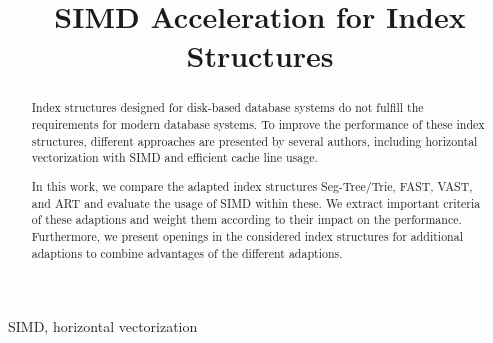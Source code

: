 \documentclass[conference]{IEEEtran}
\begin{document}
\title{SIMD Acceleration for Index Structures\\
}

\author{
}

\maketitle

\begin{abstract}
Index structures designed for disk-based database systems do not fulfill the requirements for modern database systems. To improve the performance of these index structures, different approaches are presented by several authors, including horizontal vectorization with SIMD and efficient cache line usage. 

In this work, we compare the adapted index structures Seg-Tree/Trie, FAST, VAST, and ART and evaluate the usage of SIMD within these. We extract important criteria of these adaptions and weight them according to their impact on the performance. Furthermore, we present openings in the considered index structures for additional adaptions to combine advantages of the different adaptions.
\end{abstract}

\begin{IEEEkeywords}
SIMD, horizontal vectorization
\end{IEEEkeywords}
\end{document}
